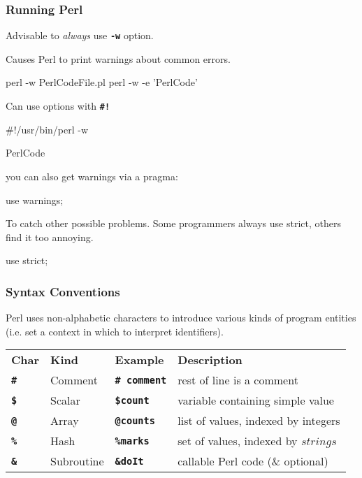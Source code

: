 \begin{frame}[fragile]
\frametitle{Running Perl}
Advisable to {\it{always}} use \textbf{\tt{-w}} option.

Causes Perl to print warnings about common errors.
\begin{sh}
    perl -w PerlCodeFile.pl
    perl -w -e 'PerlCode'
\end{sh}

Can use options with \textbf{\tt{\#!}}
\begin{perl}
    #!/usr/bin/perl -w
    
    PerlCode
\end{perl}

you can also get warnings via a pragma:

\begin{perl}
    use warnings;
\end{perl}

To catch other possible problems.
Some programmers always use strict, others find it too annoying.

\begin{perl}
    use strict;
\end{perl}

\end{frame}

\begin{frame}
\frametitle{Syntax Conventions}
Perl uses non-alphabetic characters to introduce various kinds of
program entities
{\small (i.e. set a context in which to interpret identifiers)}.

\begin{center}
\begin{tabular}{llll}

  {\bf{Char}} & 
  {\bf{Kind}} & 
  {\bf{Example}} & 
  {\bf{Description}}
\\

  {\bf{\textbf{\tt{\#}}}} & 
  Comment & 
  \textbf{\tt{\# comment}} & 
  rest of line is a comment
\\

  {\bf{\textbf{\tt{\$}}}} & 
  Scalar & 
  \textbf{\tt{\$count}} & 
  variable containing simple value
\\

  {\bf{\textbf{\tt{@}}}} & 
  Array & 
  \textbf{\tt{@counts}} & 
  list of values, indexed by integers
\\

  {\bf{\textbf{\tt{\%}}}} & 
  Hash & 
  \textbf{\tt{\%marks}} & 
  set of values, indexed by $strings$
\\

  {\bf{\textbf{\tt{\&}}}} & 
  Subroutine & 
  \textbf{\tt{\&doIt}} & 
  callable Perl code
  (\& optional)
\\
\end{tabular}
\end{center}
~\\\vspace{1ex}
\end{frame}

